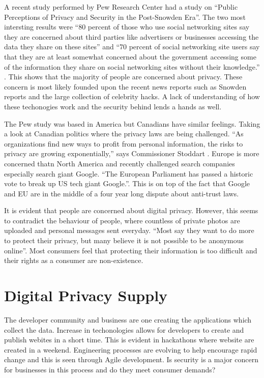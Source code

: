 \documentclass[12pt]{article}
\begin{document}
A recent study performed by Pew Research Center had a study on ``Public Perceptions of Privacy and Security in the Post-Snowden Era''. The two most intersting results were ``80 percent of those who use social networking sites say they are concerned about third parties like advertisers or businesses accessing the data they share on these sites'' and ``70 percent of social networking site users say that they are at least somewhat concerned about the government accessing some of the information they share on social networking sites without their knowledge.'' \cite{Madden}. This shows that the majority of people are concerned about privacy. These concern is most likely founded upon the recent news reports such as Snowden reports and the large collection of celebrity hacks. A lack of understanding of how these techonogies work and the security behind lends a hands as well.

The Pew study was based in America but Canadians have similar feelings. Taking a look at Canadian politics where the privacy laws are being challenged. ``As organizations find new ways to profit from personal information, the risks to privacy are growing exponentially,'' says Commissioner Stoddart \cite{PrivacyCommissioner}. Europe is more concerned thatn North America and recently challenged search companies especially search giant Google. ``The European Parliament has passed a historic vote to break up US tech giant Google.''\cite{Cook}. This is on top of the fact that Google and EU are in the middle of a four year long dispute about anti-trust laws.

It is evident that people are concerned about digital privacy. However, this seems to contradict the behaviour of people, where countless of private photos are uploaded and personal messages sent everyday. ``Most say they want to do more to protect their privacy, but many believe it is not possible to be anonymous online''\cite{Madden}. Most consumers feel that protecting their information is too difficult and their rights as a consumer are non-existence. 

\section{Digital Privacy Supply}\label{sec:supply}
The developer community and business are one creating the applications which collect the data. Increase in techonologies allows for developers to create and publish webites in a short time. This is evident in hackathons where website are created in a weekend. Engineering processes are evolving to help encourage rapid change and this is seen through Agile development. Is security is a major concern for businesses in this process and do they meet consumer demands?
\end{document}
